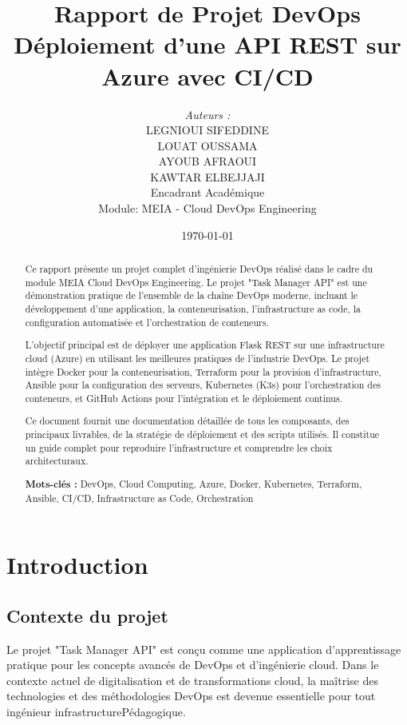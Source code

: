\documentclass[12pt,a4paper,twoside]{report}
\title{\vspace{2cm}\textbf{\Huge Rapport de Projet DevOps}\\\textbf{\Large Déploiement d'une API REST sur Azure avec CI/CD}\vspace{2cm}}
\author{\Large \textit{Auteurs :}\\[0.5cm]\Large LEGNIOUI SIFEDDINE\\LOUAT OUSSAMA\\AYOUB AFRAOUI\\KAWTAR ELBEJJAJI\\\vspace{2cm}\large Encadrant Académique\\Module: MEIA - Cloud DevOps Engineering}
\date{\large \today}
\begin{document}
\maketitle
\thispagestyle{empty}
\newpage

\begin{abstract}
\noindent
Ce rapport présente un projet complet d'ingénierie DevOps réalisé dans le cadre du module MEIA Cloud DevOps Engineering. Le projet "Task Manager API" est une démonstration pratique de l'ensemble de la chaîne DevOps moderne, incluant le développement d'une application, la conteneurisation, l'infrastructure as code, la configuration automatisée et l'orchestration de conteneurs.

L'objectif principal est de déployer une application Flask REST sur une infrastructure cloud (Azure) en utilisant les meilleures pratiques de l'industrie DevOps. Le projet intègre Docker pour la conteneurisation, Terraform pour la provision d'infrastructure, Ansible pour la configuration des serveurs, Kubernetes (K3s) pour l'orchestration des conteneurs, et GitHub Actions pour l'intégration et le déploiement continus.

Ce document fournit une documentation détaillée de tous les composants, des principaux livrables, de la stratégie de déploiement et des scripts utilisés. Il constitue un guide complet pour reproduire l'infrastructure et comprendre les choix architecturaux.

\vspace{1cm}
\textbf{Mots-clés :} DevOps, Cloud Computing, Azure, Docker, Kubernetes, Terraform, Ansible, CI/CD, Infrastructure as Code, Orchestration
\end{abstract}

\newpage

\tableofcontents
\newpage

\chapter{Introduction}

\section{Contexte du projet}

Le projet "Task Manager API" est conçu comme une application d'apprentissage pratique pour les concepts avancés de DevOps et d'ingénierie cloud. Dans le contexte actuel de digitalisation et de transformations cloud, la maîtrise des technologies et des méthodologies DevOps est devenue essentielle pour tout ingénieur infrastructurePédagogique.
\end{document}
